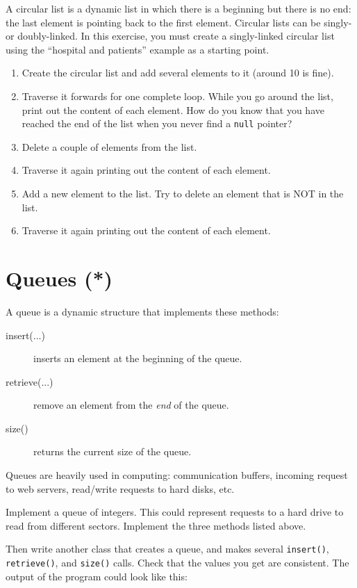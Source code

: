 \documentclass{article}
\begin{document}
A circular list is a dynamic list in which there is a beginning but
there is no end: the last element is pointing back to the first
element. Circular lists can be singly- or doubly-linked. In this
exercise, you must create a singly-linked circular list using the
``hospital and patients'' example as a starting point.

\begin{enumerate}
\item Create the circular list and add several elements to it
  (around 10 is fine). 
\item Traverse it forwards for one complete loop. While you go around
  the list, print out the content of each element. How do you know
  that you have reached the end of the list when you never find a
  \verb+null+ pointer? 
\item Delete a couple of elements from the list. 
\item Traverse it again printing out the content of
  each element.
\item Add a new element to the list. Try to delete an element that is
  NOT in the list. 
\item Traverse it again printing out the content of
  each element.
\end{enumerate}

\section{Queues (*)}
\label{sec:queues}

A queue is a dynamic structure that implements these methods: 

\begin{description}
\item[insert(...)] inserts an element at the beginning of the queue.
\item[retrieve(...) ] remove an element from the \emph{end} of the queue.
\item[size() ] returns the current size of the queue. 
\end{description}

Queues are heavily used in computing: communication
buffers, incoming request to web servers, read/write requests to hard
disks, etc. 

Implement a queue of integers. This could represent requests
to a hard drive to read from different sectors. Implement the three
methods listed above. 

Then write another class that creates a queue, and makes several
\verb+insert()+, \verb+retrieve()+, and \verb+size()+ calls. Check
that the values you get are consistent. The output of the program
could look like this: 
\end{document}
